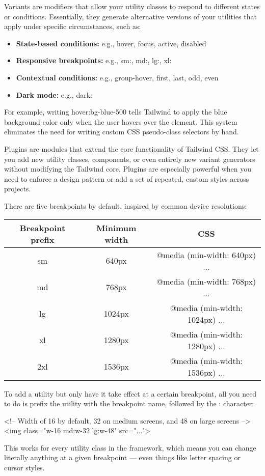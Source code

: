 \documentclass{report}
\begin{document}
    \pagebreak 
    \bigbreak \noindent 
    Variants are modifiers that allow your utility classes to respond to different states or conditions. Essentially, they generate alternative versions of your utilities that apply under specific circumstances, such as:
    \begin{itemize}
        \item \textbf{State-based conditions:} e.g., hover, focus, active, disabled
        \item \textbf{Responsive breakpoints:} e.g., sm:, md:, lg:, xl:
        \item \textbf{Contextual conditions:} e.g., group-hover, first, last, odd, even
        \item \textbf{Dark mode:} e.g., dark:
    \end{itemize}
    \bigbreak \noindent 
    For example, writing hover:bg-blue-500 tells Tailwind to apply the blue background color only when the user hovers over the element. This system eliminates the need for writing custom CSS pseudo-class selectors by hand.

    \pagebreak 
    \bigbreak \noindent 
    Plugins are modules that extend the core functionality of Tailwind CSS. They let you add new utility classes, components, or even entirely new variant generators without modifying the Tailwind core. Plugins are especially powerful when you need to enforce a design pattern or add a set of repeated, custom styles across projects.

    \pagebreak 
    \bigbreak \noindent 
    There are five breakpoints by default, inspired by common device resolutions:
    \bigbreak \noindent 
    \begin{center}
        \begin{tabular}{c|c|c}
            Breakpoint prefix	&Minimum width	&CSS \\
            \hline
            sm	&640px	&@media (min-width: 640px) { ... } \\
            md	&768px	&@media (min-width: 768px) { ... } \\
            lg	&1024px	&@media (min-width: 1024px) { ... }\\
            xl	&1280px	&@media (min-width: 1280px) { ... }\\
            2xl	&1536px	&@media (min-width: 1536px) { ... }
        \end{tabular}
    \end{center}
    \bigbreak \noindent 
    To add a utility but only have it take effect at a certain breakpoint, all you need to do is prefix the utility with the breakpoint name, followed by the : character:
    \bigbreak \noindent 
    \begin{htmlcode}
        <!-- Width of 16 by default, 32 on medium screens, and 48 on large screens -->
        <img class="w-16 md:w-32 lg:w-48" src="...">
    \end{htmlcode}
    \bigbreak \noindent 
    This works for every utility class in the framework, which means you can change literally anything at a given breakpoint — even things like letter spacing or cursor styles.
    \bigbreak \noindent 
\end{document}
